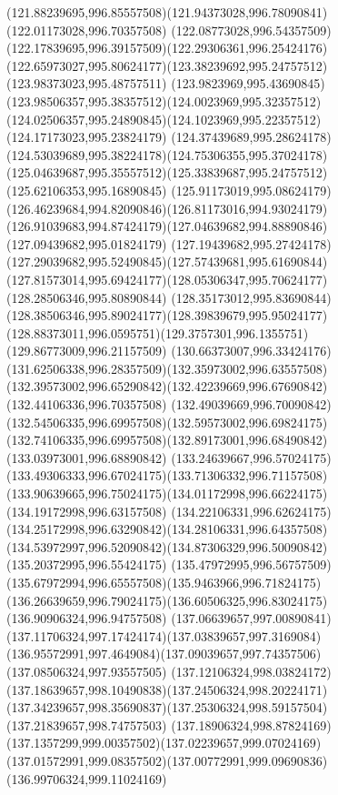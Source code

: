 {{\curveto(121.88239695,996.85557508)(121.94373028,996.78090841)(122.01173028,996.70357508)
\curveto(122.08773028,996.54357509)(122.17839695,996.39157509)(122.29306361,996.25424176)
\curveto(122.65973027,995.80624177)(123.38239692,995.24757512)(123.98373023,995.48757511)
\curveto(123.9823969,995.43690845)(123.98506357,995.38357512)(124.0023969,995.32357512)
\curveto(124.02506357,995.24890845)(124.1023969,995.22357512)(124.17173023,995.23824179)
\curveto(124.37439689,995.28624178)(124.53039689,995.38224178)(124.75306355,995.37024178)
\curveto(125.04639687,995.35557512)(125.33839687,995.24757512)(125.62106353,995.16890845)
\curveto(125.91173019,995.08624179)(126.46239684,994.82090846)(126.81173016,994.93024179)
\curveto(126.91039683,994.87424179)(127.04639682,994.88890846)(127.09439682,995.01824179)
\curveto(127.19439682,995.27424178)(127.29039682,995.52490845)(127.57439681,995.61690844)
\curveto(127.81573014,995.69424177)(128.05306347,995.70624177)(128.28506346,995.80890844)
\curveto(128.35173012,995.83690844)(128.38506346,995.89024177)(128.39839679,995.95024177)
\curveto(128.88373011,996.0595751)(129.3757301,996.1355751)(129.86773009,996.21157509)
\curveto(130.66373007,996.33424176)(131.62506338,996.28357509)(132.35973002,996.63557508)
\curveto(132.39573002,996.65290842)(132.42239669,996.67690842)(132.44106336,996.70357508)
\curveto(132.49039669,996.70090842)(132.54506335,996.69957508)(132.59573002,996.69824175)
\curveto(132.74106335,996.69957508)(132.89173001,996.68490842)(133.03973001,996.68890842)
\curveto(133.24639667,996.57024175)(133.49306333,996.67024175)(133.71306332,996.71157508)
\curveto(133.90639665,996.75024175)(134.01172998,996.66224175)(134.19172998,996.63157508)
\curveto(134.22106331,996.62624175)(134.25172998,996.63290842)(134.28106331,996.64357508)
\curveto(134.53972997,996.52090842)(134.87306329,996.50090842)(135.20372995,996.55424175)
\curveto(135.47972995,996.56757509)(135.67972994,996.65557508)(135.9463966,996.71824175)
\curveto(136.26639659,996.79024175)(136.60506325,996.83024175)(136.90906324,996.94757508)
\curveto(137.06639657,997.00890841)(137.11706324,997.17424174)(137.03839657,997.3169084)
\curveto(136.95572991,997.4649084)(137.09039657,997.74357506)(137.08506324,997.93557505)
\curveto(137.12106324,998.03824172)(137.18639657,998.10490838)(137.24506324,998.20224171)
\curveto(137.34239657,998.35690837)(137.25306324,998.59157504)(137.21839657,998.74757503)
\curveto(137.18906324,998.87824169)(137.1357299,999.00357502)(137.02239657,999.07024169)
\curveto(137.01572991,999.08357502)(137.00772991,999.09690836)(136.99706324,999.11024169)
}}
